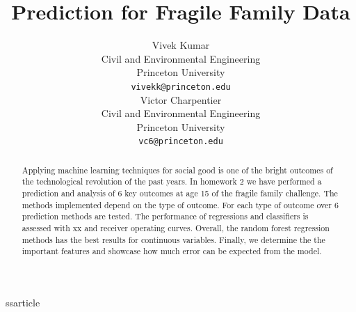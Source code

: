 ss{article} %
\usepackage[utf8]{inputenc}
\usepackage{cos424,times}
\usepackage{url}
\usepackage{graphicx}
\usepackage{amsmath}
\usepackage{amssymb}
\usepackage{float}
\usepackage{enumitem}
\usepackage{hyperref}

\graphicspath{{./figures/}} 

\newcommand{\R}{\mathbb{R}}
\newcommand{\D}{\mathbb{D}}
\newcommand{\I}{\mathbb{I}}
\DeclareMathOperator*{\argmax}{arg\,max}
\DeclareMathOperator*{\argmin}{arg\,min}
\usepackage{natbib}


\title{Prediction for Fragile Family Data}


\author{
Vivek Kumar\\
Civil and Environmental Engineering\\
Princeton University\\
\texttt{vivekk@princeton.edu} \\
\And
Victor Charpentier\\
Civil and Environmental Engineering\\
Princeton University\\
\texttt{vc6@princeton.edu} \\
}

\newcommand{\fix}{\marginpar{FIX}}
\newcommand{\new}{\marginpar{NEW}}



\maketitle

\begin{abstract}
Applying machine learning techniques for social good is one of the bright outcomes of the technological revolution of the past years. In homework 2 we have performed a prediction and analysis of 6 key outcomes at age 15 of the fragile family challenge. The methods implemented depend on the type of outcome. For each type of outcome over 6 prediction methods are tested. The performance of regressions and classifiers is assessed with xx and receiver operating curves. Overall, the random forest regression methods has the best results for continuous variables. Finally, we determine the the important features and showcase how much error can be expected from the model.
\end{abstract}
